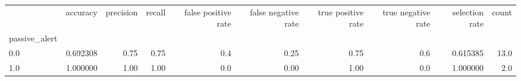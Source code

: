 \begin{tabular}{lrrrrrrrrr}
\toprule
{} &  accuracy &  precision &  recall &  false positive rate &  false negative rate &  true positive rate &  true negative rate &  selection rate &  count \\
passive\_alert &           &            &         &                      &                      &                     &                     &                 &        \\
\midrule
0.0           &  0.692308 &       0.75 &    0.75 &                  0.4 &                 0.25 &                0.75 &                 0.6 &        0.615385 &   13.0 \\
1.0           &  1.000000 &       1.00 &    1.00 &                  0.0 &                 0.00 &                1.00 &                 0.0 &        1.000000 &    2.0 \\
\bottomrule
\end{tabular}
